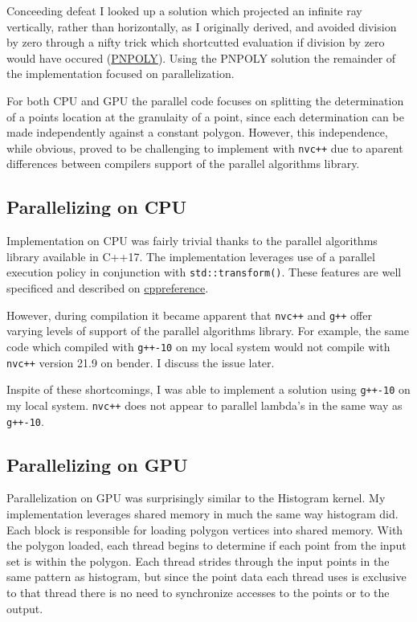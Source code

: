 \documentclass{article}
\begin{document}
Conceeding defeat I looked up a solution which projected an infinite ray vertically, rather than horizontally, as I originally derived, and avoided division by zero through a nifty trick which shortcutted evaluation if division by zero would have occured (\href{https://wrf.ecse.rpi.edu/Research/Short_Notes/pnpoly.html}{PNPOLY}). Using the PNPOLY solution the remainder of the implementation focused on parallelization.

For both CPU and GPU the parallel code focuses on splitting the determination of a points location at the granulaity of a point, since each determination can be made independently against a constant polygon. However, this independence, while obvious, proved to be challenging to implement with \texttt{nvc++} due to aparent differences between compilers support of the parallel algorithms library.

\subsection{Parallelizing on CPU}
Implementation on CPU was fairly trivial thanks to the parallel algorithms library available in C++17. The implementation leverages use of a parallel execution policy in conjunction with \texttt{std::transform()}.  These features are well specificed and described on \href{https://en.cppreference.com/w/cpp/algorithm/execution_policy_tag_t}{cppreference}. 

However, during compilation it became apparent that \texttt{nvc++} and \texttt{g++} offer varying levels of support of the parallel algorithms library. For example, the same code which compiled with \texttt{g++-10} on my local system would not compile with \texttt{nvc++} version 21.9 on bender. I discuss the issue later.

Inspite of these shortcomings, I was able to implement a solution using \texttt{g++-10} on my local system. \texttt{nvc++} does not appear to parallel lambda's in the same way as \texttt{g++-10}.

\subsection{Parallelizing on GPU}
Parallelization on GPU was surprisingly similar to the Histogram kernel. My implementation leverages shared memory in much the same way histogram did. Each block is responsible for loading polygon vertices into shared memory. With the polygon loaded, each thread begins to determine if each point from the input set is within the polygon. Each thread strides through the input points in the same pattern as histogram, but since the point data each thread uses is exclusive to that thread there is no need to synchronize accesses to the points or to the output. 
\end{document}
